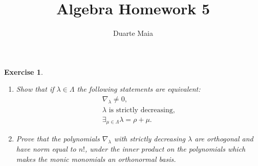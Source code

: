 \documentclass{article}
\title{Algebra Homework 5}
\author{Duarte Maia}
\newtheorem{ex}{Exercise}
\theoremstyle{nonumberplain}
\begin{document}
\maketitle

\begin{ex}
\leavevmode
\begin{enumerate}
\item Show that if $\lambda \in \Lambda$ the following statements are equivalent:
\begin{gather}
\nabla_\lambda \neq 0,\label{eq:c1}\\
\text{$\lambda$ is strictly decreasing},\label{eq:c2}\\
\exists_{\mu \in \Lambda} \lambda = \rho + \mu.\label{eq:c3}
\end{gather}
\item Prove that the polynomials $\nabla_\lambda$ \emph{with strictly decreasing $\lambda$} are orthogonal and have norm equal to $n!$, under the inner product on the polynomials which makes the monic monomials an orthonormal basis.
\end{enumerate}
\end{ex}
\end{document}
